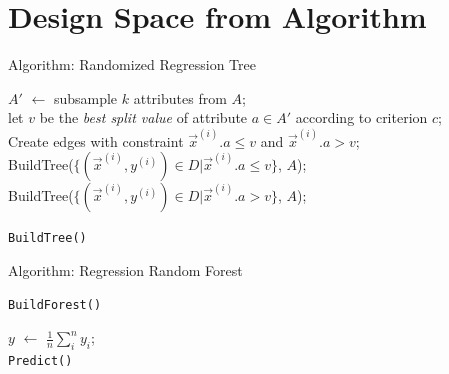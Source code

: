 \section{Design Space from Algorithm}
\begin{frame}[c]{Algorithm: Randomized Regression Tree}

\begin{algorithm}[H]
\BlankLine
{} {
}
 {
}
\pause
$A'$ $\leftarrow$ subsample $k$ attributes from $A$;\\
let $v$ be the \emph{best split value} of attribute $a \in A'$ according to criterion $c$;\\ 
\pause
Create edges with constraint $\vec{x}^{(i)}.a \leq v$ and $\vec{x}^{(i)}.a > v$;\\
BuildTree($\{ (\vec{x}^{(i)}, y^{(i)}) \in D | \vec{x}^{(i)}.a \leq v\}$, $A$);\\
BuildTree($\{ (\vec{x}^{(i)}, y^{(i)}) \in D | \vec{x}^{(i)}.a > v\}$, $A$);
	
\caption{\texttt{BuildTree()}}
\end{algorithm}

\end{frame}
\begin{frame}[c]{Algorithm: Regression Random Forest}

\begin{algorithm}[H]
\BlankLine

	
\caption{\texttt{BuildForest()}}
\end{algorithm}

\pause
\bigskip

\begin{algorithm}[H]
\BlankLine


$y$ $\leftarrow$ $\frac{1}{n}\sum_{i}^n y_i$;\\
	
\caption{\texttt{Predict()}}
\end{algorithm}


\end{frame}
